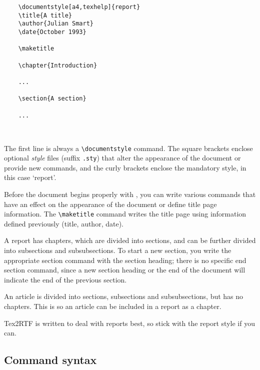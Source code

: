 \begin{verbatim}
    \documentstyle[a4,texhelp]{report}
    \title{A title}
    \author{Julian Smart}
    \date{October 1993}
    
    \maketitle

    \chapter{Introduction}

    ...

    \section{A section}

    ...

    
\end{verbatim}

The first line is always a \verb$\documentstyle$ command. The square brackets
enclose optional {\it style} files (suffix {\tt .sty}) that alter the appearance
of the document or provide new commands, and the curly brackets enclose
the mandatory style, in this case `report'.

Before the document begins properly with \verb$$,
you can write various commands that have an effect on the appearance of the
document or define title page information. The \verb$\maketitle$ command
writes the title page using information defined previously (title, author,
date).

A report has chapters, which are divided into sections, and can be further
divided into subsections and subsubsections. To start a new section, you
write the appropriate section command with the section heading; there is
no specific end section command, since a new section heading or the end
of the document will indicate the end of the previous section.

An article is divided into sections, subsections and subsubsections, but
has no chapters. This is so an article can be included in a report as a chapter.

Tex2RTF is written to deal with reports best, so stick with the report
style if you can.

\subsection{Command syntax}

